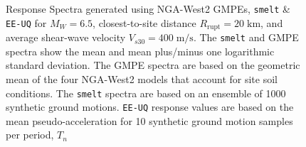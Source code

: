 \begin{figure}[!htbp]
  \caption[Response Spectra generated using NGA-West2
    GMPEs, \texttt{smelt} \& \texttt{EE-UQ} for $M_W = 6.5$, $R_{\textrm{rupt}}
    = 20\;\textrm{km}$, and $V_{s30} = 400\;\textrm{m/s}$]
    {Response Spectra generated using NGA-West2
    GMPEs, \texttt{smelt} \& \texttt{EE-UQ} for $M_W = 6.5$,
    closest-to-site distance $R_{\textrm{rupt}} = 20\;\textrm{km}$, and average shear-wave
    velocity $V_{s30} = 400\;\textrm{m/s}$. The \texttt{smelt} and GMPE
    spectra show the mean and mean plus/minus one logarithmic standard
    deviation. The GMPE spectra are based on the geometric mean of the
    four NGA-West2 models that account for site soil
    conditions. The \texttt{smelt} spectra are based on an ensemble of
    1000 synthetic ground motions. \texttt{EE-UQ} response values are
    based on the mean pseudo-acceleration for 10 synthetic ground
    motion samples per period, $T_n$}
  \label{fig:stochastic_validation}
\end{figure}
